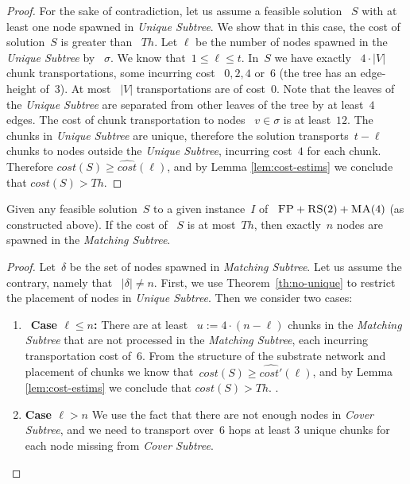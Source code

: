 \documentclass[preprint,12pt]{elsarticle}
\newcommand{\FP}{\textsc{FP}}
\newcommand{\RS}{\textsc{RS}}
\newcommand{\MA}{\textsc{MA}}
\newcommand{\Solution}{S}
\newcommand{\CostSol}{\textit{cost}(\Solution)}
\newcommand{\CostEstimOne}{\widehat{cost}}
\newcommand{\CostEstimTwo}{\widehat{cost'}}
\newcommand{\numNodes}{\ensuremath{|V|}}
\newcommand{\UnqSubtree}{{{\emph{Unique Subtree}}}}
\newcommand{\MatchSubtree}{{\emph{Matching Subtree}}}
\newcommand{\CoverSubtree}{{\emph{Cover Subtree}}}
\newcommand{\SpawnedUnqSubtree}{\sigma}
\newcommand{\SpawnedMatchSubtree}{\delta}
\newcommand{\Thr}{\ensuremath{Th}}
\begin{document}
\begin{proof}
  For the sake of contradiction, let us assume a feasible solution
 ~$\Solution$ with at least one node spawned in {\UnqSubtree}. We show
  that in this case, the cost of solution~$\Solution$ is greater than
 ~$\Thr$. Let $\ell$ be the number of nodes spawned in the {\UnqSubtree} by
 ~$\SpawnedUnqSubtree$. We know
  that~$1 \leq \ell \leq t$.  In~$\Solution$ we have exactly
 ~$4 \cdot \numNodes$ chunk transportations, some incurring cost
 ~$0, 2, 4$ or~$6$ (the tree has an edge-height of~$3$). At most
 ~$\numNodes$ transportations are of cost~$0$. Note that the leaves of the
  {\UnqSubtree} are separated from other leaves of the tree by at
  least~$4$ edges.  The cost of chunk transportation to nodes
 ~$v \in \SpawnedUnqSubtree$ is at least~$12$. The chunks in
  {\UnqSubtree} are unique, therefore the solution transports~$t - \ell$
  chunks to nodes outside the \UnqSubtree, incurring cost~$4$ for each
  chunk.
  Therefore $\CostSol \geq \CostEstimOne(\ell)$, and by Lemma \ref{lem:cost-estims}
  we conclude that $\CostSol > \Thr$.
\end{proof}



\begin{lemma}
  Given any feasible solution~$\Solution$ to a given instance~$I$ of
 ~$\FP+\RS(2)+\MA(4)$ (as constructed above). If the cost of
 ~$\Solution$ is at most~$\Thr$, then exactly~$n$ nodes are spawned in the
  \MatchSubtree.
  \label{th:np-balance}
\end{lemma}
\begin{proof}
  Let~$\SpawnedMatchSubtree$ be the set of nodes spawned in
  {\MatchSubtree}.  Let us assume the contrary, namely that
 ~$|\SpawnedMatchSubtree| \neq n$.  First, we use
  Theorem~\ref{th:no-unique} to restrict the placement of nodes in
  \UnqSubtree. Then we consider two cases:
  \begin{enumerate}
    
    \item~\textbf{Case $\ell \leq n$:} There are at least
   ~$u := 4 \cdot (n-\ell)$ chunks in the {\MatchSubtree} that are not
    processed in the {\MatchSubtree}, each incurring transportation
    cost of~$6$.
     From the structure of the substrate network and placement of
    chunks we know that~$\CostSol \geq \CostEstimTwo(\ell)$, and by Lemma \ref{lem:cost-estims}
  we conclude that $\CostSol > \Thr$.
.

    \item \textbf{Case $\ell>n$} We use the fact that there are not enough nodes in
    {\CoverSubtree}, and we need to transport over~$6$ hops at least 3
    unique chunks for each node missing from {\CoverSubtree}.
  \end{enumerate}
\end{proof}
\end{document}
